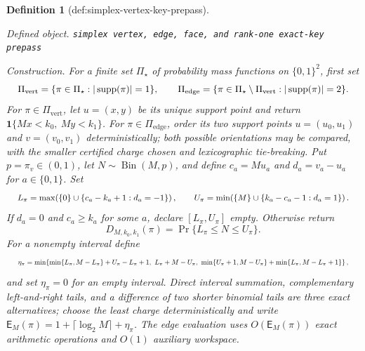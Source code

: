 \documentclass{article}
\newtheorem{definition}{Definition}
\begin{document}
\begin{definition}[def:simplex-vertex-key-prepass]\label{def:simplex-vertex-key-prepass}
\par\smallskip\noindent\emph{Defined object.} \texttt{simplex vertex,\allowbreak{} edge,\allowbreak{} face,\allowbreak{} and rank-\allowbreak{}one exact-\allowbreak{}key prepass}
\par\smallskip\noindent\emph{Construction.} For a finite set \(\Pi_\star\) of probability mass functions on \(\{0,1\}^2\), first set
\[
\makebox[\linewidth][c]{\resizebox{0.98\linewidth}{!}{\(\displaystyle \Pi_{\mathrm{vert}}=\{\pi\in\Pi_\star:|\operatorname{supp}(\pi)|=1\},
\qquad
\Pi_{\mathrm{edge}}=\{\pi\in\Pi_\star\setminus\Pi_{\mathrm{vert}}:|\operatorname{supp}(\pi)|=2\}.\)}}
\]
For \(\pi\in\Pi_{\mathrm{vert}}\), let \(u=(x,y)\) be its unique support point and return \(\mathbf 1\{Mx<k_0,\ My<k_1\}\). For \(\pi\in\Pi_{\mathrm{edge}}\), order its two support points \(u=(u_0,u_1)\) and \(v=(v_0,v_1)\) deterministically; both possible orientations may be compared, with the smaller certified charge chosen and lexicographic tie-breaking. Put \(p=\pi_v\in(0,1)\), let \(N\sim\operatorname{Bin}(M,p)\), and define \(c_a=Mu_a\) and \(d_a=v_a-u_a\) for \(a\in\{0,1\}\). Set
\[
\makebox[\linewidth][c]{\resizebox{0.98\linewidth}{!}{\(\displaystyle L_\pi=\max\!\left(\{0\}\cup\{c_a-k_a+1:d_a=-1\}\right),\qquad
U_\pi=\min\!\left(\{M\}\cup\{k_a-c_a-1:d_a=1\}\right).\)}}
\]
If \(d_a=0\) and \(c_a\ge k_a\) for some \(a\), declare \([L_\pi,U_\pi]\) empty. Otherwise return
\[
D_{M,k_0,k_1}(\pi)=\Pr\{L_\pi\le N\le U_\pi\}.
\]
For a nonempty interval define
\[
\makebox[\linewidth][c]{\resizebox{0.98\linewidth}{!}{\(\displaystyle \eta_\pi=\min\!\left\{
\min\{L_\pi,M-L_\pi\}+U_\pi-L_\pi+1,\ 
L_\pi+M-U_\pi,\ 
\min\{U_\pi+1,M-U_\pi\}+\min\{L_\pi,M-L_\pi+1\}
\right\},\)}}
\]
and set \(\eta_\pi=0\) for an empty interval. Direct interval summation, complementary left-and-right tails, and a difference of two shorter binomial tails are three exact alternatives; choose the least charge deterministically and write \(\mathsf E_M(\pi)=1+\lceil\log_2 M\rceil+\eta_\pi\). The edge evaluation uses \(O(\mathsf E_M(\pi))\) exact arithmetic operations and \(O(1)\) auxiliary workspace.


\end{definition}
\end{document}
